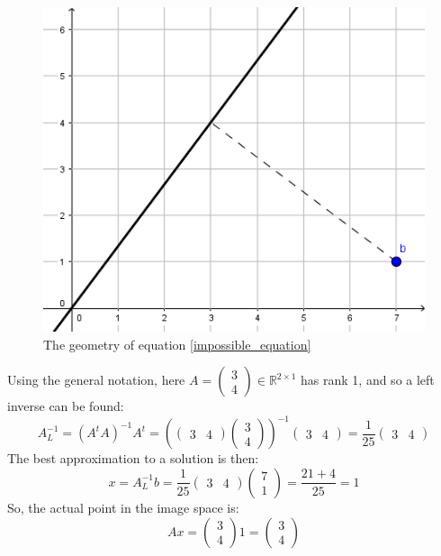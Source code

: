\documentclass[12pt, a4paper]{article}
\numberwithin{equation}{section}
\begin{document}
\begin{figure}
\centering
\includegraphics{left_inverse}
\caption{The geometry of equation \ref{impossible_equation}}
\label{fig:left_inverse}
\end{figure}

Using the general notation, here $A=\begin{pmatrix}3 \\ 4\end{pmatrix}\in\mathbb{R}^{2\times 1}$ has rank 1, and so a left inverse can be found:
\begin{equation}
A^{-1}_L=(A^t A)^{-1}A^t=\left(\begin{pmatrix}3 & 4\end{pmatrix}\begin{pmatrix}3 \\ 4\end{pmatrix}\right)^{-1}\begin{pmatrix}3 & 4\end{pmatrix}=\frac{1}{25}\begin{pmatrix}3 & 4\end{pmatrix}
\end{equation}
The best approximation to a solution is then:
\begin{equation}
x=A^{-1}_L b=\frac{1}{25}\begin{pmatrix}3 & 4\end{pmatrix}\begin{pmatrix}7 \\ 1\end{pmatrix}=\frac{21+4}{25}=1
\end{equation}
So, the actual point in the image space is:
\begin{equation}
Ax=\begin{pmatrix}3 \\ 4\end{pmatrix}1=\begin{pmatrix}3 \\ 4\end{pmatrix}
\end{equation}
\end{document}
